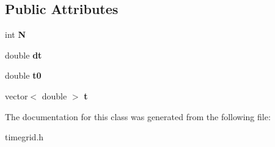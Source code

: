 \subsection*{Public Attributes}
\begin{DoxyCompactItemize}
\item 
\mbox{\label{classtimegrid_a6ea4198e47d1f0d980bf5f8946bfe3e7}} 
int {\bfseries N}
\item 
\mbox{\label{classtimegrid_aceb551e1c0a33527598d5a86d8e0eec9}} 
double {\bfseries dt}
\item 
\mbox{\label{classtimegrid_ac0200b6c3d4a052b1056519254e175ac}} 
double {\bfseries t0}
\item 
\mbox{\label{classtimegrid_a272c1b6826c832dc755c87f00d9bf17d}} 
vector$<$ double $>$ {\bfseries t}
\end{DoxyCompactItemize}


The documentation for this class was generated from the following file\+:\begin{DoxyCompactItemize}
\item 
timegrid.\+h\end{DoxyCompactItemize}
